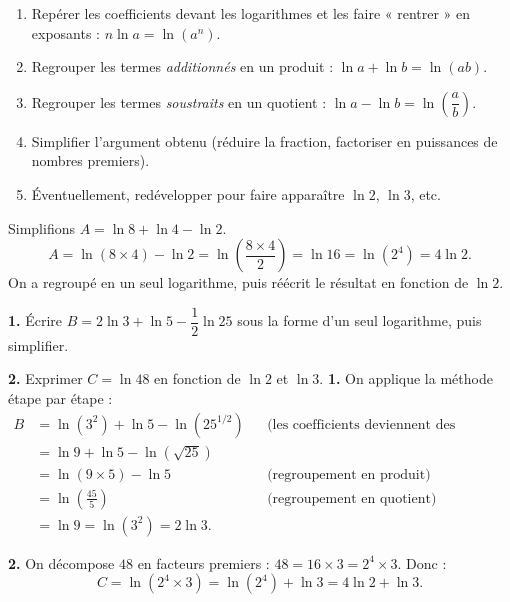 \documentclass[11pt]{article}
\begin{document}
\begin{methode}
\begin{enumerate}
\item Repérer les coefficients devant les logarithmes et les faire « rentrer » en exposants : $n\ln a = \ln(a^n)$.
\item Regrouper les termes \emph{additionnés} en un produit : $\ln a + \ln b = \ln(ab)$.
\item Regrouper les termes \emph{soustraits} en un quotient : $\ln a - \ln b = \ln\left(\dfrac{a}{b}\right)$.
\item Simplifier l'argument obtenu (réduire la fraction, factoriser en puissances de nombres premiers).
\item Éventuellement, redévelopper pour faire apparaître $\ln 2$, $\ln 3$, etc.
\end{enumerate}
\end{methode}

\begin{exemplebox}
Simplifions $A = \ln 8 + \ln 4 - \ln 2$.
\[
A = \ln(8 \times 4) - \ln 2 = \ln\left(\frac{8 \times 4}{2}\right) = \ln 16 = \ln(2^4) = 4\ln 2.
\]
On a regroupé en un seul logarithme, puis réécrit le résultat en fonction de $\ln 2$.
\end{exemplebox}

\begin{exoresolu}
\textbf{1.} Écrire $B = 2\ln 3 + \ln 5 - \dfrac{1}{2}\ln 25$ sous la forme d'un seul logarithme, puis simplifier.

\textbf{2.} Exprimer $C = \ln 48$ en fonction de $\ln 2$ et $\ln 3$.
\tcblower
\textbf{1.} On applique la méthode étape par étape :
\begin{align*}
B &= \ln(3^2) + \ln 5 - \ln\left(25^{1/2}\right) & &\text{(les coefficients deviennent des exposants)}\\
&= \ln 9 + \ln 5 - \ln(\sqrt{25})\\
&= \ln(9 \times 5) - \ln 5 & &\text{(regroupement en produit)}\\
&= \ln\left(\frac{45}{5}\right) & &\text{(regroupement en quotient)}\\
&= \ln 9 = \ln(3^2) = 2\ln 3.
\end{align*}

\textbf{2.} On décompose $48$ en facteurs premiers : $48 = 16 \times 3 = 2^4 \times 3$. Donc :
\[
C = \ln(2^4 \times 3) = \ln(2^4) + \ln 3 = 4\ln 2 + \ln 3.
\]
\end{exoresolu}
\end{document}
